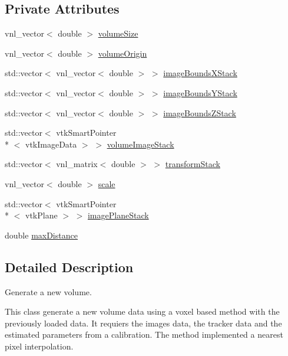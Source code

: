 \subsection*{Private Attributes}
\begin{DoxyCompactItemize}
\item 
vnl\-\_\-vector$<$ double $>$ \hyperlink{class_volume_reconstruction_a7ad648349d7db6376ab9e2fed94cbff9}{volume\-Size}
\item 
vnl\-\_\-vector$<$ double $>$ \hyperlink{class_volume_reconstruction_ada4102ad3e89c1e3dfe2d8aa2147493a}{volume\-Origin}
\item 
std\-::vector$<$ vnl\-\_\-vector$<$ double $>$ $>$ \hyperlink{class_volume_reconstruction_a96b8325b93561329706e8fa152b31568}{image\-Bounds\-X\-Stack}
\item 
std\-::vector$<$ vnl\-\_\-vector$<$ double $>$ $>$ \hyperlink{class_volume_reconstruction_a4e8c38f1168e4b35c026af2700f3aabc}{image\-Bounds\-Y\-Stack}
\item 
std\-::vector$<$ vnl\-\_\-vector$<$ double $>$ $>$ \hyperlink{class_volume_reconstruction_a00e60d5e0d604279caabe68c4ebc8fda}{image\-Bounds\-Z\-Stack}
\item 
std\-::vector$<$ vtk\-Smart\-Pointer\\*
$<$ vtk\-Image\-Data $>$ $>$ \hyperlink{class_volume_reconstruction_a9974405ea1911b5922a28ae682087730}{volume\-Image\-Stack}
\item 
std\-::vector$<$ vnl\-\_\-matrix$<$ double $>$ $>$ \hyperlink{class_volume_reconstruction_a4be301f984c70fa431aa176535882eca}{transform\-Stack}
\item 
vnl\-\_\-vector$<$ double $>$ \hyperlink{class_volume_reconstruction_a6911c1ecd44ed6cc11f73740db81f6c0}{scale}
\item 
std\-::vector$<$ vtk\-Smart\-Pointer\\*
$<$ vtk\-Plane $>$ $>$ \hyperlink{class_volume_reconstruction_a3ff58286a3dded49e06408d2ff60bb67}{image\-Plane\-Stack}
\item 
double \hyperlink{class_volume_reconstruction_a05a3b2bff77b320303dc6ca1e8a94cad}{max\-Distance}
\end{DoxyCompactItemize}


\subsection{Detailed Description}
Generate a new volume. 

This class generate a new volume data using a voxel based method with the previously loaded data. It requiers the images data, the tracker data and the estimated parameters from a calibration. The method implemented a nearest pixel interpolation. 

